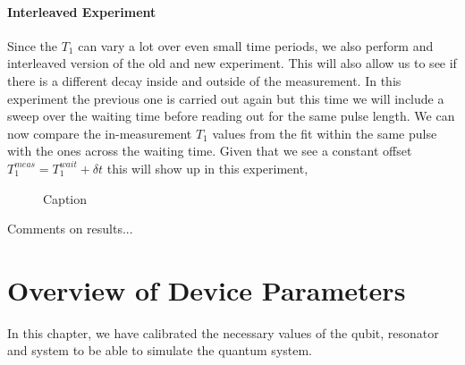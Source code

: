 \paragraph{Interleaved Experiment } Since the $T_1$ can vary a lot over even small time periods, we also perform and interleaved version of the old and new experiment. This will also allow us to see if there is a different decay inside and outside of the measurement. In this experiment the previous one is carried out again but this time we will include a sweep over the waiting time before reading out for the same pulse length. We can now compare the in-measurement $T_1$ values from the fit within the same pulse with the ones across the waiting time. Given that we see a constant offset $T_1^{meas} = T_1^{wait} + \delta t$ this will show up in this experiment,

\begin{figure}
    \centering
    \caption{Caption}
    \label{fig:enter-label}
\end{figure}

Comments on results... 



\section{Overview of Device Parameters}
In this chapter, we have calibrated the necessary values of the qubit, resonator and system to be able to simulate the quantum system.



